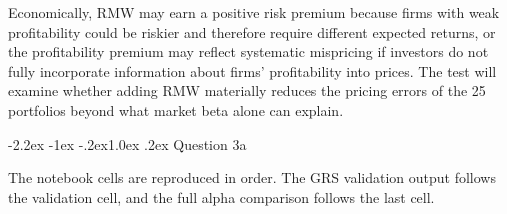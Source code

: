 \documentclass[11pt]{article}
\makeatletter
\renewcommand\subsection{\@startsection{subsection}{2}{0pt}%
  {-2.2ex \@plus -1ex \@minus -.2ex}{1.0ex \@plus .2ex}%
  {\normalfont\bfseries\normalsize\color{psink}}}
\makeatother
\begin{document}
Economically, RMW may earn a positive risk premium because firms with weak
profitability could be riskier and therefore require different expected
returns, or the profitability premium may reflect systematic mispricing if
investors do not fully incorporate information about firms' profitability
into prices. The test will examine whether adding RMW materially reduces the
pricing errors of the 25 portfolios beyond what market beta alone can
explain.

\subsection{Question 3a}

The notebook cells are reproduced in order. The GRS validation output
follows the validation cell, and the full alpha comparison follows the last
cell.
\end{document}
